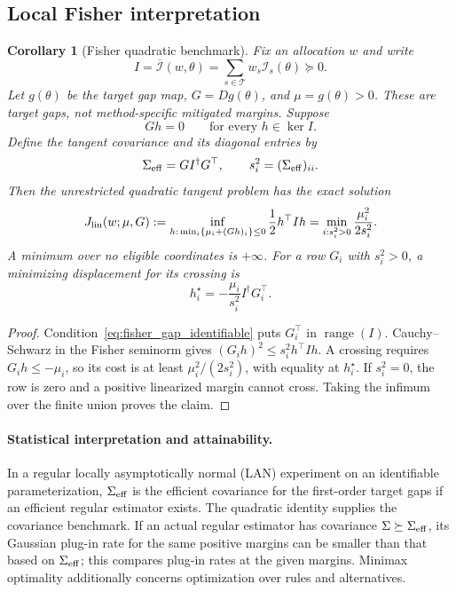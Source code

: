 \documentclass[a4paper,onecolumn,unpublished,nopdfoutputerror]{quantumarticle}
\theoremstyle{plain}
\newtheorem{corollary}[theorem]{Corollary}
\theoremstyle{definition}
\newcommand{\1}{\mathbf{1}}
\begin{document}
\subsection{Local Fisher interpretation}
\label{app:local_fisher}
\begin{corollary}[Fisher quadratic benchmark]
\label{cor:shot_to_gaussian}
Fix an allocation $w$ and write
\[
I=\overline{\mathcal I}(w,\theta)=\sum_{s\in\mathcal T}w_s\mathcal I_s(\theta)\succeq0.
\]
Let $g(\theta)$ be the target gap map, $G=Dg(\theta)$, and $\mu=g(\theta)>0$. These are target gaps, not method-specific mitigated margins. Suppose
\begin{equation}\label{eq:fisher_gap_identifiable}
Gh=0\qquad\text{for every }h\in\ker I.
\end{equation}
Define the tangent covariance and its diagonal entries by
\begin{equation}\label{eq:fisher_gap_covariance}
\Sigma_{\rm eff}=GI^\dagger G^\top,\qquad s_i^2=(\Sigma_{\rm eff})_{ii}.
\end{equation}
Then the unrestricted quadratic tangent problem has the exact solution
\begin{equation}\label{eq:fisher_linear_cost}
J_{\rm lin}(w;\mu,G)
:=\inf_{h:\,\min_i\{\mu_i+(Gh)_i\}\le0}\frac12h^\top Ih
=\min_{i:s_i^2>0}\frac{\mu_i^2}{2s_i^2}.
\end{equation}
A minimum over no eligible coordinates is $+\infty$. For a row $G_i$ with $s_i^2>0$, a minimizing displacement for its crossing is
\[
h_i^\star=-\frac{\mu_i}{s_i^2}I^\dagger G_i^\top.
\]
\end{corollary}

\begin{proof}
Condition~\eqref{eq:fisher_gap_identifiable} puts $G_i^\top$ in $\operatorname{range}(I)$. Cauchy--Schwarz in the Fisher seminorm gives $(G_i h)^2\le s_i^2 h^\top Ih$. A crossing requires $G_i h\le-\mu_i$, so its cost is at least $\mu_i^2/(2s_i^2)$, with equality at $h_i^\star$. If $s_i^2=0$, the row is zero and a positive linearized margin cannot cross. Taking the infimum over the finite union proves the claim.
\end{proof}

\paragraph{Statistical interpretation and attainability.}
In a regular locally asymptotically normal (LAN) experiment on an identifiable parameterization, $\Sigma_{\rm eff}$ is the efficient covariance for the first-order target gaps if an efficient regular estimator exists. The quadratic identity supplies the covariance benchmark. If an actual regular estimator has covariance $\Sigma\succeq\Sigma_{\rm eff}$, its Gaussian plug-in rate for the same positive margins can be smaller than that based on $\Sigma_{\rm eff}$; this compares plug-in rates at the given margins. Minimax optimality additionally concerns optimization over rules and alternatives.
\end{document}
